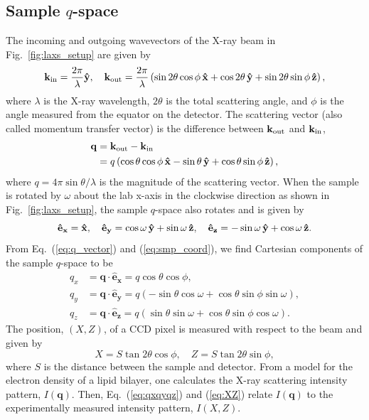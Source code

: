 \subsection{Sample $q$-space}\label{sec:sample_q-space}
The incoming and outgoing wavevectors of the X-ray beam in Fig.~\ref{fig:laxs_setup}
are given by
\begin{equation}
  \mathbf{k}_{\mathrm{in}} = \frac{2\pi}{\lambda} \mathbf{\hat{y}}, \quad
  \mathbf{k}_{\mathrm{out}} = 
    \frac{2\pi}{\lambda} \left( 
      \sin 2\theta \cos\phi \, \mathbf{\hat{x}}
      + \cos 2\theta \, \mathbf{\hat{y}}
      + \sin 2\theta \sin\phi \, \mathbf{\hat{z}} 
    \right),
\end{equation}
where $\lambda$ is the X-ray wavelength, $2\theta$ is the total scattering
angle, and $\phi$ is the angle measured from the equator on the detector. 
The scattering vector (also called
momentum transfer vector) is
the difference between $\mathbf{k}_{\mathrm{out}}$ and $\mathbf{k}_{\mathrm{in}}$,
\begin{align}
  \mathbf{q} &= \mathbf{k}_{\mathrm{out}} - \mathbf{k}_{\mathrm{in}} \nonumber \\
             &= q \left( 
                  \cos\theta\cos\phi \, \mathbf{\hat{x}} - \sin\theta \, \mathbf{\hat{y}}
                  + \cos\theta\sin\phi \, \mathbf{\hat{z}}
                \right),
  \label{eq:q_vector}
\end{align}
where $q=4\pi\sin\theta/\lambda$ is the magnitude of the scattering vector. 
When the sample is rotated by $\omega$ about the lab x-axis in the clockwise 
direction as shown in Fig.~\ref{fig:laxs_setup}, the sample $q$-space also 
rotates and 
is given by  
\begin{equation}
  \mathbf{\hat{e}_x} = \mathbf{\hat{x}}, \quad
  \mathbf{\hat{e}_y} = \cos\omega\,\mathbf{\hat{y}} + \sin\omega\,\mathbf{\hat{z}}, \quad
  \mathbf{\hat{e}_z} = -\sin\omega\,\mathbf{\hat{y}} + \cos\omega\,\mathbf{\hat{z}}.
  \label{eq:smp_coord}
\end{equation}
From Eq.~(\ref{eq:q_vector}) and (\ref{eq:smp_coord}), we find Cartesian
components of the sample $q$-space to be
\begin{align}
  q_x &= \mathbf{q}\cdot\mathbf{\hat{e}_x} 
       = q\cos\theta\cos\phi, 
       \nonumber\\
  q_y &= \mathbf{q}\cdot\mathbf{\hat{e}_y} 
       = q\left(-\sin\theta\cos\omega + \cos\theta\sin\phi\sin\omega\right), 
       \nonumber\\
  q_z &= \mathbf{q}\cdot\mathbf{\hat{e}_z} 
       = q\left(\sin\theta\sin\omega + \cos\theta\sin\phi\cos\omega\right).
       \label{eq:qxqyqz}
\end{align}
The position, $(X,Z)$, of a CCD pixel is measured with respect to the beam 
and given by
\begin{equation}
  X = S \tan 2\theta \cos\phi, \quad Z = S \tan 2\theta \sin\phi,
  \label{eq:XZ}
\end{equation} 
where $S$ is the distance between the sample and detector.
From a model for the electron density of a lipid bilayer, one calculates
the X-ray scattering intensity pattern, $I(\mathbf{q})$. Then, Eq.~(\ref{eq:qxqyqz})
and (\ref{eq:XZ}) relate $I(\mathbf{q})$ to the experimentally measured
intensity pattern, $I(X,Z)$. 

